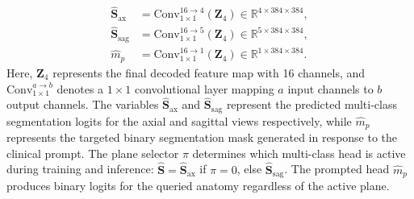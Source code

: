 \documentclass[journal]{IEEEtran}
\begin{document}
\begin{equation} \label{eq:segmentation_heads}
\begin{aligned}
    \hat{\mathbf{S}}_{\text{ax}} &= \text{Conv}_{1\times 1}^{16 \to 4}(\mathbf{Z}_4) \in \mathbb{R}^{4 \times 384 \times 384}, \\
    \hat{\mathbf{S}}_{\text{sag}} &= \text{Conv}_{1\times 1}^{16 \to 5}(\mathbf{Z}_4) \in \mathbb{R}^{5 \times 384 \times 384}, \\
    \hat{m}_p &= \text{Conv}_{1\times 1}^{16 \to 1}(\mathbf{Z}_4) \in \mathbb{R}^{1 \times 384 \times 384}.
\end{aligned}
\end{equation}
Here, $\mathbf{Z}_4$ represents the final decoded feature map with 16 channels, and $\text{Conv}_{1\times 1}^{a \to b}$ denotes a $1 \times 1$ convolutional layer mapping $a$ input channels to $b$ output channels. The variables $\hat{\mathbf{S}}_{\text{ax}}$ and $\hat{\mathbf{S}}_{\text{sag}}$ represent the predicted multi-class segmentation logits for the axial and sagittal views respectively, while $\hat{m}_p$ represents the targeted binary segmentation mask generated in response to the clinical prompt. The plane selector $\pi$ determines which multi-class head is active during training and inference: $\hat{\mathbf{S}} = \hat{\mathbf{S}}_{\text{ax}}$ if $\pi=0$, else $\hat{\mathbf{S}}_{\text{sag}}$. The prompted head $\hat{m}_p$ produces binary logits for the queried anatomy regardless of the active plane.
\end{document}
